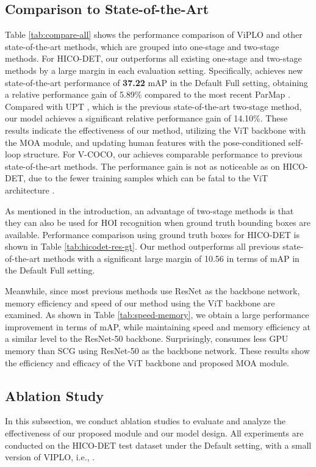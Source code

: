 \documentclass[10pt,twocolumn,letterpaper]{article}
\begin{document}
\subsection{Comparison to State-of-the-Art}
\label{sec:4-2}
Table \ref{tab:compare-all} shows the performance comparison of ViPLO and other state-of-the-art methods, which are grouped into one-stage and two-stage methods. For HICO-DET, our  outperforms all existing one-stage and two-stage methods by a large margin in each evaluation setting. Specifically,  achieves new state-of-the-art performance of \textbf{37.22} mAP in the Default Full setting, obtaining a relative performance gain of 5.89\% compared to the most recent ParMap \cite{wu2022mining}. Compared with UPT \cite{zhang2022efficient}, which is the previous state-of-the-art two-stage method, our model achieves a significant relative performance gain of 14.10\%. These results indicate the effectiveness of our method, utilizing the ViT backbone with the MOA module, and updating human features with the pose-conditioned self-loop structure. For V-COCO, our  achieves comparable performance to previous state-of-the-art methods. The performance gain is not as noticeable as on HICO-DET, due to the fewer training samples which can be fatal to the ViT architecture \cite{touvron2021training}.

As mentioned in the introduction, an advantage of two-stage methods is that
they can also be used for HOI recognition when ground truth bounding boxes are available. Performance comparison using ground truth boxes for HICO-DET is shown in Table \ref{tab:hicodet-res-gt}. Our method outperforms all previous state-of-the-art methods with a significant large margin of 10.56 in terms of mAP in the Default Full setting. 

Meanwhile, since most previous methods use ResNet as the backbone network, memory efficiency and speed of our method using the ViT backbone are examined. As shown in Table \ref{tab:speed-memory}, we obtain a large performance improvement in terms of mAP, while maintaining speed and memory efficiency at a similar level to the ResNet-50 backbone. Surprisingly,  consumes less GPU memory than SCG using ResNet-50 as the backbone network. These results show the efficiency and efficacy of the ViT backbone and proposed MOA module. 






\subsection{Ablation Study}
\label{sec:4-3}
In this subsection, we conduct ablation studies to evaluate and analyze the effectiveness of our proposed module and our model design. All experiments are conducted on the HICO-DET test dataset under the Default setting, with a small version of VIPLO, i.e., .
\end{document}
